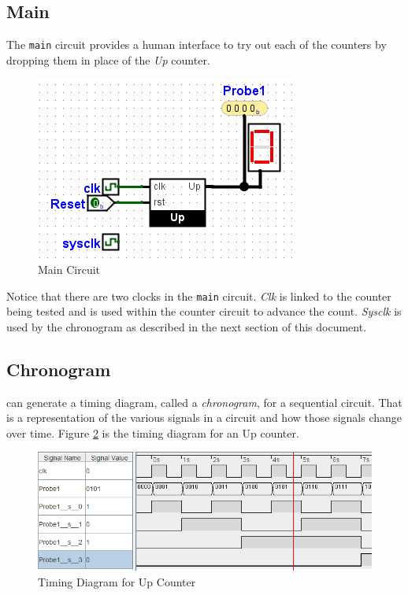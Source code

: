 \subsection{Main}

The \lstinline[columns=fixed]|main| circuit provides a human interface to try out each of the counters by dropping them in place of the \textit{Up} counter.

\begin{figure}[H]
	\centering
	\includegraphics[width=\maxwidth{.95\linewidth}]{gfx/count-06}
	\caption{Main Circuit}
	\label{fig:count-06}
\end{figure}

Notice that there are two clocks in the \lstinline[columns=fixed]|main| circuit. \textit{Clk} is linked to the counter being tested and is used within the counter circuit to advance the count. \textit{Sysclk} is used by the \LE chronogram as described in the next section of this document.

\subsection{Chronogram}

\LE can generate a timing diagram, called a \textit{chronogram}, for a sequential circuit. That is a representation of the various signals in a circuit and how those signals change over time. Figure \ref{fig:count-07} is the timing diagram for an Up counter.

\begin{figure}[H]
	\centering
	\includegraphics[width=\maxwidth{.95\linewidth}]{gfx/count-07}
	\caption{Timing Diagram for Up Counter}
	\label{fig:count-07}
\end{figure}

